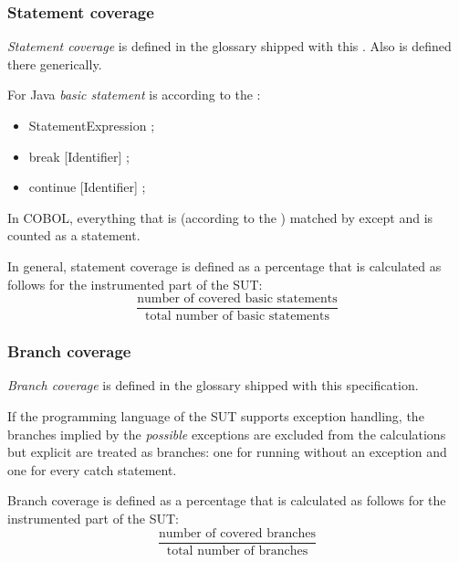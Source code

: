 \subsubsection{Statement coverage}
\textit{Statement coverage} is defined in the glossary shipped with this . Also \textit{} is defined there generically.
\par
For Java \textit{basic statement} is according to the :
\begin{itemize}
  \item StatementExpression ;
  \item break [Identifier] ;
  \item continue [Identifier] ;
\end{itemize}
\par
In COBOL, everything that is (according to the ) matched by  except  and  is counted as a statement.
\par
In general, statement coverage is defined as a percentage that
is calculated as follows for the instrumented part of the SUT:
\begin{equation*}
\frac{\text{number of covered basic statements}}{\text{total number of basic statements}}
\end{equation*}

\subsubsection{Branch coverage}
\textit{Branch coverage} is defined in the glossary shipped with this specification.
\par
If the programming language of the SUT supports exception handling, the branches implied by the \emph{possible} exceptions are excluded from the  calculations but explicit  are treated as branches: one for running without an exception and one for every catch statement.
\par
Branch coverage is defined as a percentage that is calculated as follows for the instrumented part of the SUT:
\begin{equation*}
\frac{\text{number of covered branches}}{\text{total number of branches}}
\end{equation*}

